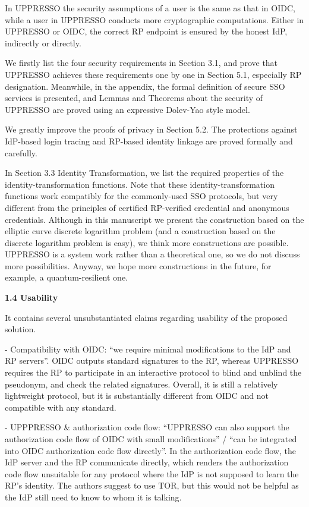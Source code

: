 \documentclass[letterpaper,onecolumn,10pt]{article}
\begin{document}
In UPPRESSO
    the security assumptions of a user is the same as that in OIDC,
        while a user in UPPRESSO conducts more cryptographic computations.
Either in UPPRESSO or OIDC,
    the correct RP endpoint is ensured by the honest IdP, indirectly or directly.

We firstly list the four security requirements in Section 3.1,
    and prove that UPPRESSO achieves these requirements one by one in Section 5.1, especially RP designation.
Meanwhile,
    in the appendix, the formal definition of secure SSO services is presented,
        and Lemmas and Theorems about the security of UPPRESSO are proved using an expressive Dolev-Yao style model.

We greatly improve the proofs of privacy in Section 5.2.
The protections against IdP-based login tracing and RP-based identity linkage are proved formally and carefully.

In Section 3.3 Identity Transformation,
    we list the required properties of the identity-transformation functions.
Note that these identity-transformation functions work compatibly for the commonly-used SSO protocols,
        but very different from the principles of certified RP-verified credential and anonymous credentials.
Although in this manuscript we present the construction based on the elliptic curve discrete logarithm problem
     (and a construction based on the discrete logarithm problem is  easy),
        we think more constructions are possible.
UPPRESSO is a system work rather than a theoretical one, so we do not discuss more possibilities.
Anyway, we hope more constructions in the future, for example, a quantum-resilient one.

\vspace{1mm}\noindent\textbf{1.4 Usability}

It contains several unsubstantiated claims regarding usability of the proposed solution.

- Compatibility with OIDC: ``we require minimal modifications to the IdP and RP servers''.
OIDC outputs standard signatures to the RP, whereas UPPRESSO requires the RP to participate in an interactive protocol to blind and unblind the pseudonym, and check the related signatures. Overall, it is still a relatively lightweight protocol, but it is substantially different from OIDC and not compatible with any standard.

- UPPPRESSO \& authorization code flow: ``UPPRESSO can also support the authorization code flow of OIDC with small modifications'' / ``can be integrated into OIDC authorization code flow directly''.
In the authorization code flow, the IdP server and the RP communicate directly, which renders the authorization code flow unsuitable for any protocol where the IdP is not supposed to learn the RP's identity. The authors suggest to use TOR, but this would not be helpful as the IdP still need to know to whom it is talking.
\end{document}
